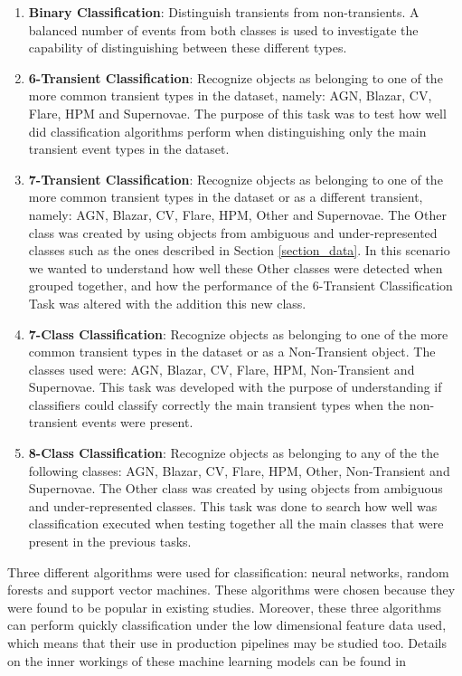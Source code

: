\documentclass[a4paper,fleqn,usenatbib]{mnras}
\begin{document}
\begin{enumerate}
    \item \textbf{Binary Classification}: 
    Distinguish transients from non-transients. A balanced number of events from both classes is used to investigate the capability of distinguishing between these different types.
    \item \textbf{6-Transient Classification}: Recognize objects as belonging to one of the more common transient types in the dataset, namely: AGN, Blazar, CV, Flare, HPM and Supernovae. The purpose of this task was to test how well did classification algorithms perform when distinguishing only the main transient event types in the dataset.
    \item \textbf{7-Transient Classification}: Recognize objects as belonging to one of the more common transient types in the dataset or as a different transient, namely: AGN, Blazar, CV, Flare, HPM, Other and Supernovae. The Other class was created by using objects from ambiguous and under-represented classes such as the ones described in Section \ref{section_data}. In this scenario we wanted to understand how well these Other classes were detected when grouped together, and how the performance of the 6-Transient Classification Task was altered with the addition this new class.
    \item \textbf{7-Class Classification}: Recognize objects as belonging to one of the more common transient types in the dataset or as a Non-Transient object. The classes used were: AGN, Blazar, CV, Flare, HPM, Non-Transient and Supernovae. This task was developed with the purpose of understanding if classifiers could classify correctly the main transient types when the non-transient events were present.
    \item \textbf{8-Class Classification}: Recognize objects as belonging to any of the the following classes: AGN, Blazar, CV, Flare, HPM, Other, Non-Transient and Supernovae. The Other class was created by using objects from ambiguous and under-represented classes. This task was done to search how well was classification executed when testing together all the main classes that were present in the previous tasks.
\end{enumerate}

Three different algorithms were used for classification: neural networks, random forests and support vector machines. These algorithms were chosen because they were found to be popular in existing studies. Moreover, these three algorithms can perform quickly classification under the low dimensional feature data used, which means that their use in production pipelines may be studied too. Details on the inner workings of these machine learning models can be found in \cite{9780387848570}
\end{document}
